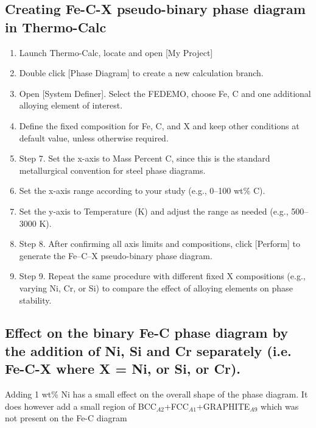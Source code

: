 \documentclass[11pt]{article}
\begin{document}
\subsection{Creating Fe-C-X pseudo-binary phase diagram in Thermo-Calc}
\begin{enumerate}
    \item Launch Thermo-Calc, locate and open [My Project]
    \item Double click [Phase Diagram] to create a new calculation branch. 
    \item Open [System Definer]. Select the FEDEMO, choose Fe, C and one additional alloying element of interest. 
    \item Define the fixed composition for Fe, C, and X and keep other conditions at default value, unless otherwise required. 
    \item Step 7. Set the x-axis to Mass Percent C, since this is the standard metallurgical convention for steel phase diagrams.
    \item Set the x-axis range according to your study (e.g., 0–100 wt\% C).
    \item Set the y-axis to Temperature (K) and adjust the range as needed (e.g., 500–3000 K).
    \item Step 8. After confirming all axis limits and compositions, click [Perform] to generate the Fe–C–X pseudo-binary phase diagram.
    \item Step 9. Repeat the same procedure with different fixed X compositions (e.g., varying Ni, Cr, or Si) to compare the effect of alloying elements on phase stability.

\end{enumerate}

\subsection{Effect on the binary Fe-C phase diagram by the addition of Ni, Si and Cr 
separately (i.e. Fe-C-X where X = Ni, or Si, or Cr).
}
Adding 1 wt\% Ni has a small effect on the overall shape of the phase diagram. It does however add a small region of BCC$_{A2}$+FCC$_{A1}$+GRAPHITE$_{A9}$ which was not present on the Fe-C diagram
\end{document}
